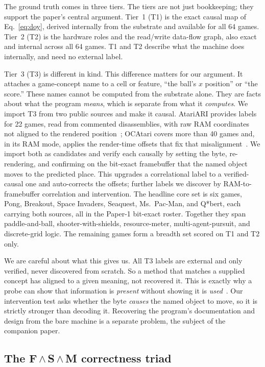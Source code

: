 The ground truth comes in three tiers. The tiers are not just bookkeeping; they support the
paper's central argument. Tier~1 (T1) is the exact causal map of Eq.~\eqref{eq:doy},
derived internally from the substrate and available for all 64 games. Tier~2 (T2) is the
hardware roles and the read/write data-flow graph, also exact and internal across all 64
games. T1 and T2 describe what the machine does internally, and need no external label.

Tier~3 (T3) is different in kind. This difference matters for our argument. It attaches a
game-concept name to a cell or feature, ``the ball's $x$ position'' or ``the score.'' These
names cannot be computed from the substrate alone. They are facts about what the program
\emph{means}, which is separate from what it \emph{computes}. We import T3 from two public
sources and make it causal. AtariARI provides labels for 22 games, read from commented
disassemblies, with raw RAM coordinates not aligned to the rendered
position~\cite{anand2019unsupervised}; OCAtari covers more than 40 games and, in its RAM
mode, applies the render-time offsets that fix that misalignment~\cite{delfosse2023ocatari}.
We import both as candidates and verify each causally by setting the byte, re-rendering, and
confirming on the bit-exact framebuffer that the named object moves to the predicted place.
This upgrades a correlational label to a verified-causal one and auto-corrects the offsets;
further labels we discover by RAM-to-framebuffer correlation and intervention. The headline
core set is six games, Pong, Breakout, Space Invaders, Seaquest, Ms.\ Pac-Man, and Q*bert,
each carrying both sources, all in the Paper-1 bit-exact roster. Together they span
paddle-and-ball, shooter-with-shields, resource-meter, multi-agent-pursuit, and discrete-grid
logic. The remaining games form a breadth set scored on T1 and T2 only.

We are careful about what this gives us. All T3 labels are external and only verified,
never discovered from scratch. So a method that matches a supplied concept has aligned to a
given meaning, not recovered it. This is exactly why a probe can show that information is
\emph{present} without showing it is \emph{used}~\cite{hewitt2019designing}. Our intervention
test asks whether the byte \emph{causes} the named object to move, so it is strictly stronger
than decoding it. Recovering the program's documentation and design from the bare machine is a
separate problem, the subject of the companion paper.

\subsection{The F\,$\wedge$\,S\,$\wedge$\,M correctness triad}\label{sec:triad}

